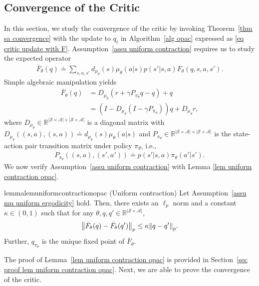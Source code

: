 \documentclass[twoside,11pt]{article}
\newcommand{\fS}{\mathcal{S}}
\newcommand{\fA}{\mathcal{A}}
\newcommand{\R}{\mathbb{R}}
\newcommand{\nsa}{{|\fS \times \fA|}}
\numberwithin{assucounter}{section}
\begin{document}
\subsection{Convergence of the Critic}
In this section,
we study the convergence of the critic by invoking Theorem~\ref{thm sa convergence}
with the update to $q_t$ in Algorithm~\ref{alg opac} expressed as \eqref{eq critic update with F}.
Assumption~\ref{assu uniform contraction} requires us to study the expected operator
\begin{align}
  \bar F_\theta(q) \doteq \sum_{s, a, s'} d_{\mu_\theta}(s) \mu_\theta(a|s) p(s'|s, a) F_\theta(q, s, a, s').
\end{align}
Simple algebraic manipulation yields
\begin{align}
  \label{eq definition of bar f theta}
  \bar F_{\theta}(q) &=  D_{\mu_\theta}(r + \gamma P_{\pi_\theta} q - q) + q \\
  &=(I - D_{\mu_\theta}(I - \gamma P_{\pi_\theta})) q  + D_{\mu_\theta} r,
\end{align}
where $D_{\mu_\theta} \in \R^{\nsa \times \nsa}$ is a diagonal matrix with $D_{\mu_\theta}((s, a), (s, a)) \doteq d_{\mu_\theta}(s) \mu_\theta(a|s)$
and $P_{\pi_\theta} \in \R^{\nsa \times \nsa}$ is the state-action pair transition matrix under policy $\pi_\theta$, i.e.,
\begin{align}
  P_{\pi_\theta}((s, a), (s', a')) \doteq p(s'|s, a)\pi_\theta(a'|s').
\end{align}
We now verify Assumption~\ref{assu uniform contraction} with Lemma \ref{lem uniform contraction opac}.
\begin{restatable}{lemma}{lemuniformcontractionopac}
  \label{lem uniform contraction opac}
  (Uniform contraction)
  Let Assumption~\ref{assu mu uniform ergodicity} hold.
  Then, there exists an $\ell_p$ norm and a constant $\kappa \in (0, 1)$ such that for any $\theta, q, q' \in \R^\nsa$,
  \begin{align}
    \norm{\bar F_\theta(q) - \bar F_\theta(q')}_p \leq \kappa \norm{q - q'}_p.
  \end{align}
  Further, $q_{\pi_\theta}$ is the unique fixed point of $\bar F_\theta$.
\end{restatable}
\noindent The proof of Lemma~\ref{lem uniform contraction opac} is provided in Section~\ref{sec proof lem uniform contraction opac}.
Next,
we are able to prove the convergence of the critic.
\end{document}
